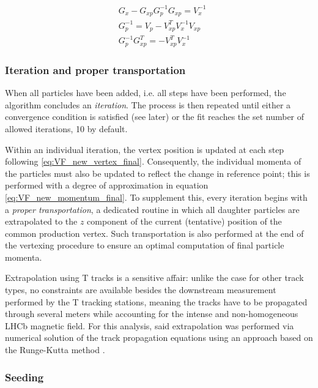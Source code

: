 \begin{subequations}
\begin{align}
&G_x - G_{xp} G_p^{-1} G_{xp} 	= V_x^{-1} \\
&G_p^{-1} 						= V_p - V_{xp}^T V_x^{-1} V_{xp} \\
&G_p^{-1} G_{xp}^T 				= -V_{xp}^T V_x^{-1}
\end{align}
\end{subequations}

\subsubsection{Iteration and proper transportation}

When all particles have been added, i.e. all steps have been performed, the algorithm concludes an \textit{iteration}.
The process is then repeated until either a convergence condition is satisfied (see later) or the fit reaches the set number of allowed iterations, 10 by default.

Within an individual iteration, the vertex position is updated at each step following \eqref{eq:VF_new_vertex_final}.
Consequently, the individual momenta of the particles must also be updated to reflect the change in reference point;
this is performed with a degree of approximation in equation \eqref{eq:VF_new_momentum_final}.
To supplement this, every iteration begins with a \textit{proper transportation}, a dedicated routine in which all daughter particles are extrapolated to the $z$ component of the current (tentative) position of the common production vertex.
Such transportation is also performed at the end of the vertexing procedure to ensure an optimal computation of final particle momenta.

Extrapolation using T tracks is a sensitive affair:
unlike the case for other track types, no constraints are available besides the downstream measurement performed by the T tracking stations, meaning the tracks have to be propagated through several meters while accounting for the intense and non-homogeneous LHCb magnetic field.
For this analysis, said extrapolation was performed via numerical solution of the track propagation equations using an approach based on the Runge-Kutta method \cite{Bos:1070314} \cite{Hairer1993}.

\subsubsection{Seeding}

